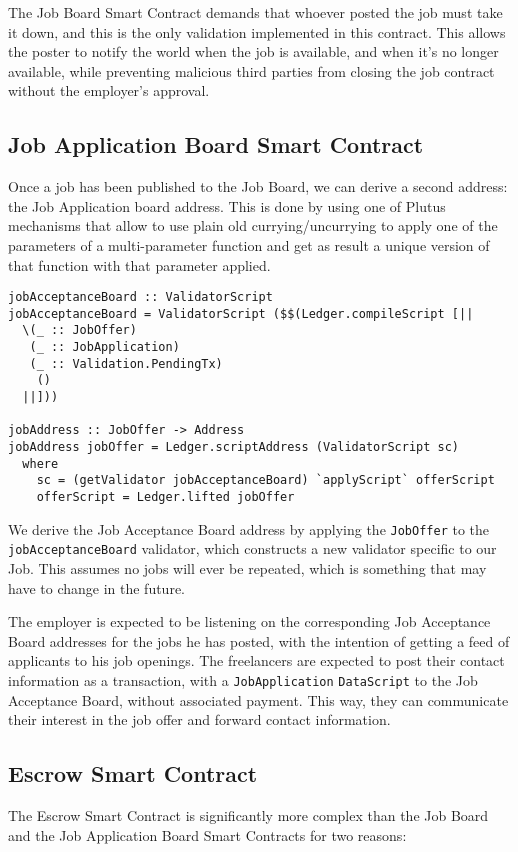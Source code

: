 \documentclass{article}
\begin{document}
The Job Board Smart Contract demands that whoever posted the job must take it down, and this is the only validation implemented in this contract. This allows the poster to notify the world when the job is available, and when it's no longer available, while preventing malicious third parties from closing the job contract without the employer's approval.

\subsection{Job Application Board Smart Contract}
Once a job has been published to the Job Board, we can derive a second address: the Job Application board address. This is done by using one of Plutus mechanisms that allow to use plain old currying/uncurrying to apply one of the parameters of a multi-parameter function and get as result a unique version of that function with that parameter applied.

\begin{samepage}
\begin{verbatim}
jobAcceptanceBoard :: ValidatorScript
jobAcceptanceBoard = ValidatorScript ($$(Ledger.compileScript [||
  \(_ :: JobOffer)
   (_ :: JobApplication)
   (_ :: Validation.PendingTx)
    ()
  ||]))

jobAddress :: JobOffer -> Address
jobAddress jobOffer = Ledger.scriptAddress (ValidatorScript sc)
  where
    sc = (getValidator jobAcceptanceBoard) `applyScript` offerScript
    offerScript = Ledger.lifted jobOffer
\end{verbatim}
\end{samepage}

We derive the Job Acceptance Board address by applying the \verb|JobOffer| to the \verb|jobAcceptanceBoard| validator, which constructs a new validator specific to our Job. This assumes no jobs will ever be repeated, which is something that may have to change in the future.

The employer is expected to be listening on the corresponding Job Acceptance Board addresses for the jobs he has posted, with the intention of getting a feed of applicants to his job openings. The freelancers are expected to post their contact information as a transaction, with a \verb|JobApplication| \verb|DataScript| to the Job Acceptance Board, without associated payment. This way, they can communicate their interest in the job offer and forward contact information.

\subsection{Escrow Smart Contract}
The Escrow Smart Contract is significantly more complex than the Job Board and the Job Application Board Smart Contracts for two reasons:
\end{document}
